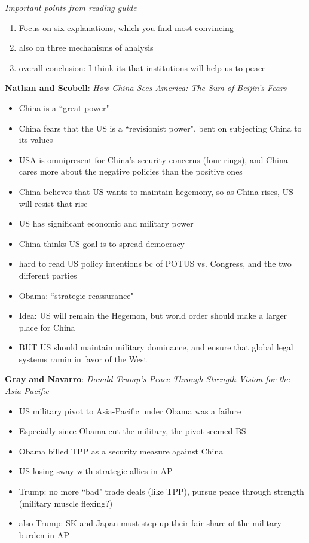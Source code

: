\documentclass{article}
\begin{document}
\textit{Important points from reading guide}
\begin{enumerate}
    \item Focus on six explanations, which you find most convincing
    \item also on three mechanisms of analysis
    \item overall conclusion: I think its that institutions will help us to peace
\end{enumerate}
\bigskip
\textbf{Nathan and Scobell}: \textit{How China Sees America: The Sum of Beijin's Fears}
\begin{itemize}
    \item China is a ``great power"
    \item China fears that the US is a ``revisionist power", bent on subjecting China to its values
    \item USA is omnipresent for China's security concerns (four rings), and China cares more about the negative policies than the positive ones
    \item China believes that US wants to maintain hegemony, so as China rises, US will resist that rise
    \item US has significant economic and military power
    \item China thinks US goal is to spread democracy
    \item hard to read US policy intentions bc of POTUS vs. Congress, and the two different parties
    \item Obama: ``strategic reassurance"
    \item Idea: US will remain the Hegemon, but world order should make a larger place for China
    \item BUT US should maintain military dominance, and ensure that global legal systems ramin in favor of the West
\end{itemize}
\medskip
\textbf{Gray and Navarro}: \textit{Donald Trump's Peace Through Strength Vision for the Asia-Pacific}
\begin{itemize}
    \item US military pivot to Asia-Pacific under Obama was a failure
    \item Especially since Obama cut the military, the pivot seemed BS
    \item Obama billed TPP as a security measure against China
    \item US losing sway with strategic allies in AP
    \item Trump: no more ``bad" trade deals (like TPP), pursue peace through strength (military muscle flexing?)
    \item also Trump: SK and Japan must step up their fair share of the military burden in AP
\end{itemize}
\end{document}
